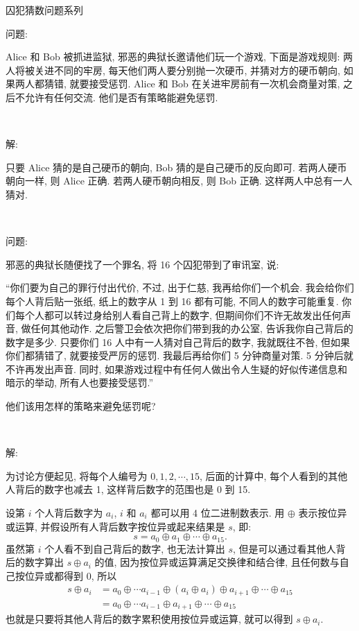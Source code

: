 \newpage
\noindent 囚犯猜数问题系列

\noindent 问题:

Alice 和 Bob 被抓进监狱, 邪恶的典狱长邀请他们玩一个游戏, 下面是游戏规则: 两人将被关进不同的牢房, 每天他们两人要分别抛一次硬币, 并猜对方的硬币朝向, 如果两人都猜错, 就要接受惩罚. Alice 和 Bob 在关进牢房前有一次机会商量对策, 之后不允许有任何交流. 他们是否有策略能避免惩罚.

~

\noindent 解: 

只要 Alice 猜的是自己硬币的朝向, Bob 猜的是自己硬币的反向即可. 若两人硬币朝向一样, 则 Alice 正确. 若两人硬币朝向相反, 则 Bob 正确. 这样两人中总有一人猜对.

~

\noindent 问题:

邪恶的典狱长随便找了一个罪名, 将 16 个囚犯带到了审讯室, 说: 

``你们要为自己的罪行付出代价, 不过, 出于仁慈, 我再给你们一个机会. 我会给你们每个人背后贴一张纸, 纸上的数字从 1 到 16 都有可能, 不同人的数字可能重复. 你们每个人都可以转过身给别人看自己背上的数字, 但期间你们不许无故发出任何声音, 做任何其他动作. 之后警卫会依次把你们带到我的办公室, 告诉我你自己背后的数字是多少. 只要你们 16 人中有一人猜对自己背后的数字, 我就既往不咎, 但如果你们都猜错了, 就要接受严厉的惩罚. 我最后再给你们 5 分钟商量对策. 5 分钟后就不许再发出声音. 同时, 如果游戏过程中有任何人做出令人生疑的好似传递信息和暗示的举动, 所有人也要接受惩罚.''

他们该用怎样的策略来避免惩罚呢?

~

\noindent 解: 

为讨论方便起见, 将每个人编号为 $0,1,2,\cdots,15$, 后面的计算中, 每个人看到的其他人背后的数字也减去 1, 这样背后数字的范围也是 0 到 15. 

设第 $i$ 个人背后数字为 $a_i$, $i$ 和 $a_i$ 都可以用 4 位二进制数表示. 用 $\oplus$ 表示按位异或运算, 并假设所有人背后数字按位异或起来结果是 $s$, 即:
\[s = a_0 \oplus a_1\oplus \cdots \oplus a_{15} .\] 
虽然第 $i$ 个人看不到自己背后的数字, 也无法计算出 $s$, 但是可以通过看其他人背后的数字算出 $s\oplus a_i$ 的值, 因为按位异或运算满足交换律和结合律, 且任何数与自己按位异或都得到 0, 所以
\begin{align*}
s\oplus a_i &= a_0\oplus\cdots a_{i-1}\oplus (a_i\oplus a_i) \oplus a_{i+1}\oplus\cdots\oplus a_{15}\\
&= a_0\oplus\cdots a_{i-1}\oplus a_{i+1}\oplus\cdots\oplus a_{15}
\end{align*}
也就是只要将其他人背后的数字累积使用按位异或运算, 就可以得到 $s\oplus a_i$. 

